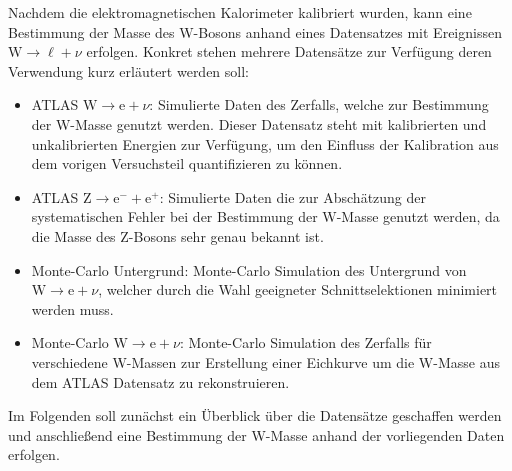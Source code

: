 \documentclass[11pt, a4paper]{article}
\numberwithin{equation}{section}
\begin{document}
Nachdem die elektromagnetischen Kalorimeter kalibriert wurden, kann eine Bestimmung der Masse des W-Bosons anhand eines Datensatzes mit Ereignissen $\mathrm{W} \rightarrow \ell + \nu$ erfolgen.
Konkret stehen mehrere Datensätze zur Verfügung deren Verwendung kurz erläutert werden soll:
\begin{itemize}
	\item ATLAS $\mathrm{W} \rightarrow \mathrm{e} + \nu$:
		Simulierte Daten des Zerfalls, welche zur Bestimmung der W-Masse genutzt werden.
		Dieser Datensatz steht mit kalibrierten und unkalibrierten Energien zur Verfügung, um den Einfluss der Kalibration aus dem vorigen Versuchsteil quantifizieren zu können.
	
	\item ATLAS $\mathrm{Z} \rightarrow \mathrm{e}^- + \mathrm{e}^+$:
		Simulierte Daten die zur Abschätzung der systematischen Fehler bei der Bestimmung der W-Masse genutzt werden, da die Masse des Z-Bosons sehr genau bekannt ist.
		
	\item Monte-Carlo Untergrund:
		Monte-Carlo Simulation des Untergrund von $\mathrm{W} \rightarrow \mathrm{e} + \nu$, welcher durch die Wahl geeigneter Schnittselektionen minimiert werden muss.
	
	\item Monte-Carlo $\mathrm{W} \rightarrow \mathrm{e} + \nu$:
		Monte-Carlo Simulation des Zerfalls für verschiedene W-Massen zur Erstellung einer Eichkurve um die W-Masse aus dem ATLAS Datensatz zu rekonstruieren.	
\end{itemize}
Im Folgenden soll zunächst ein Überblick über die Datensätze geschaffen werden und anschließend eine Bestimmung der W-Masse anhand der vorliegenden Daten erfolgen.
\end{document}
